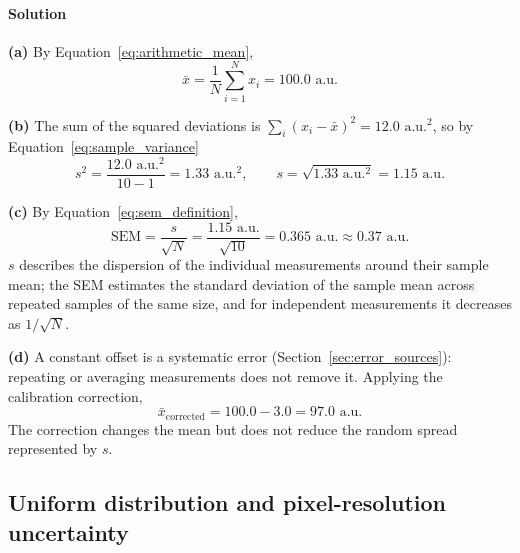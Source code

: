 \paragraph{Solution} \textbf{(a)} By Equation~\eqref{eq:arithmetic_mean},
\begin{equation*}
\bar{x} = \frac{1}{N}\sum_{i=1}^{N}x_i = 100.0\text{ a.u.}
\end{equation*}

\textbf{(b)} The sum of the squared deviations is $\sum_i(x_i - \bar{x})^2 = 12.0\text{ a.u.}^2$, so by Equation~\eqref{eq:sample_variance}
\begin{equation*}
s^2 = \frac{12.0\text{ a.u.}^2}{10 - 1} = 1.33\text{ a.u.}^2, \qquad s = \sqrt{1.33\text{ a.u.}^2} = 1.15\text{ a.u.}
\end{equation*}

\textbf{(c)} By Equation~\eqref{eq:sem_definition},
\begin{equation*}
\text{SEM} = \frac{s}{\sqrt{N}} = \frac{1.15\text{ a.u.}}{\sqrt{10}} = 0.365\text{ a.u.} \approx 0.37\text{ a.u.}
\end{equation*}
$s$ describes the dispersion of the individual measurements around their sample mean; the SEM estimates the standard deviation of the sample mean across repeated samples of the same size, and for independent measurements it decreases as $1/\sqrt{N}$.

\textbf{(d)} A constant offset is a systematic error (Section~\ref{sec:error_sources}): repeating or averaging measurements does not remove it. Applying the calibration correction,
\begin{equation*}
\bar{x}_{\text{corrected}} = 100.0 - 3.0 = 97.0\text{ a.u.}
\end{equation*}
The correction changes the mean but does not reduce the random spread represented by $s$.

\subsection{Uniform distribution and pixel-resolution uncertainty}
\label{ex:pixel_uniform_2}

